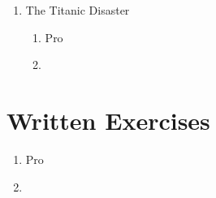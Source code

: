 \documentclass{report}
\begin{document}
\begin{enumerate}
	\item The Titanic Disaster
	\begin{enumerate}[label=(\alph*)]
		\item Pro
		\item 
	\end{enumerate}
	
\end{enumerate}

\section*{Written Exercises}
\begin{enumerate}[label=(\alph*)]
	\item Pro
	\item
\end{enumerate}
\end{document}
